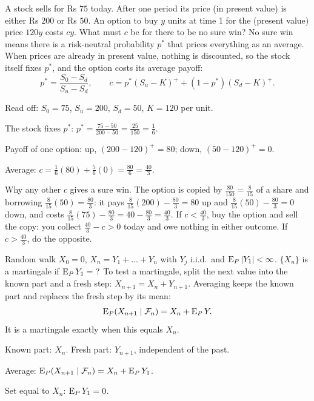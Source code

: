 \begin{problem}[Q1(a)]
A stock sells for Rs $75$ today. After one period its price (in present value) is either Rs $200$ or Rs $50$. An option to buy $y$ units at time 1 for the (present value) price $120y$ costs $cy$. What must $c$ be for there to be no sure win?
\cardsays No sure win means there is a risk-neutral probability $p^*$ that prices everything as an average. When prices are already in present value, nothing is discounted, so the stock itself fixes $p^*$, and the option costs its average payoff:
\[
p^*=\frac{S_0-S_d}{S_u-S_d},\qquad c=p^*(S_u-K)^++(1-p^*)(S_d-K)^+.
\]
\working
\begin{steps}
\item Read off: $S_0=75$, $S_u=200$, $S_d=50$, $K=120$ per unit.
\item The stock fixes $p^*$: $p^*=\frac{75-50}{200-50}=\frac{25}{150}=\frac16$.
\item Payoff of one option: up, $(200-120)^+=80$; down, $(50-120)^+=0$.
\item Average: $c=\frac16(80)+\frac56(0)=\frac{80}6=\frac{40}3$.
\item Why any other $c$ gives a sure win. The option is copied by $\frac{80}{150}=\frac8{15}$ of a share and borrowing $\frac8{15}(50)=\frac{80}3$: it pays $\frac8{15}(200)-\frac{80}3=80$ up and $\frac8{15}(50)-\frac{80}3=0$ down, and costs $\frac8{15}(75)-\frac{80}3=40-\frac{80}3=\frac{40}3$. If $c<\frac{40}3$, buy the option and sell the copy: you collect $\frac{40}3-c>0$ today and owe nothing in either outcome. If $c>\frac{40}3$, do the opposite.
\end{steps}
\end{problem}

\begin{problem}[Q1(b)]
Random walk $X_0=0$, $X_n=Y_1+\dots+Y_n$ with $Y_j$ i.i.d.\ and $\operatorname{E}_P|Y_1|<\infty$. $\{X_n\}$ is a martingale if $\operatorname{E}_PY_1=\ ?$
\cardsays To test a martingale, split the next value into the known part and a fresh step: $X_{n+1}=X_n+Y_{n+1}$. Averaging keeps the known part and replaces the fresh step by its mean:
\[
\operatorname{E}_P(X_{n+1}\mid\mathcal F_n)=X_n+\operatorname{E}_PY.
\]
It is a martingale exactly when this equals $X_n$.
\working
\begin{steps}
\item Known part: $X_n$. Fresh part: $Y_{n+1}$, independent of the past.
\item Average: $\operatorname{E}_P(X_{n+1}\mid\mathcal F_n)=X_n+\operatorname{E}_PY_1$.
\item Set equal to $X_n$: $\operatorname{E}_PY_1=0$.
\end{steps}
\end{problem}

